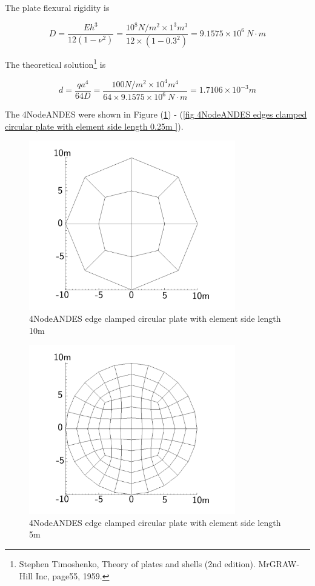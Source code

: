 \documentclass[fleqn,11pt]{article}
\begin{document}
The plate flexural rigidity is 

\begin{equation}
  D=\frac{Eh^3}{12(1-\nu^2)}=\frac{10^8 N/m^2 \times 1^3 m^3 }{12 \times (1-0.3^2) }= 9.1575 \times 10^6 \ N\cdot m
\end{equation}

The theoretical solution\footnote{Stephen Timoshenko, Theory of plates and shells (2nd edition). MrGRAW-Hill Inc, page55, 1959.} is 

\begin{equation}
  d= \frac{q a^4}{64D}=\frac{100 N/m^2 \times 10^4 m^4}{64 \times 9.1575 \times 10^6 \ N\cdot m}=1.7106\times 10^{-3} m
\end{equation}

The 4NodeANDES were shown in Figure (\ref{fig 4NodeANDES edges clamped circular plate with element side length 10m }) - (\ref{fig 4NodeANDES edges clamped circular plate with element side length 0.25m }). 




\begin{figure}[H]
  \centering
  \includegraphics[width=9cm]{../Figure-files/circular_plate1.pdf}
  \caption{4NodeANDES edge clamped circular plate with element side length 10m }
  \label{fig 4NodeANDES edges clamped circular plate with element side length 10m }
\end{figure}

\newpage

\begin{figure}[H]
  \centering
  \includegraphics[width=9cm]{../Figure-files/circular_plate2.pdf}
  \caption{4NodeANDES edge clamped circular plate with element side length 5m }
  \label{fig 4NodeANDES edges clamped circular plate with element side length 5m }
\end{figure}
\end{document}
